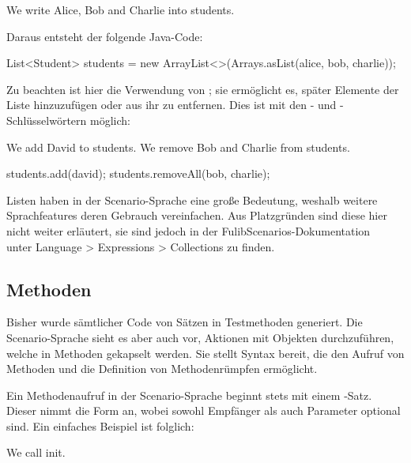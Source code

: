 \begin{codeblock}
    We write Alice, Bob and Charlie into students.
\end{codeblock}

Daraus entsteht der folgende Java-Code:

\begin{jcodeblock}
    List<Student> students = new ArrayList<>(Arrays.asList(alice, bob, charlie));
\end{jcodeblock}

Zu beachten ist hier die Verwendung von ;
sie ermöglicht es, später Elemente der Liste hinzuzufügen oder aus ihr zu entfernen.
Dies ist mit den - und -Schlüsselwörtern möglich:

\begin{codeblock}
    We add David to students.
    We remove Bob and Charlie from students.
\end{codeblock}

\begin{jcodeblock}
    students.add(david);
    students.removeAll(bob, charlie);
\end{jcodeblock}

Listen haben in der Scenario-Sprache eine große Bedeutung, weshalb weitere Sprachfeatures deren Gebrauch vereinfachen.
Aus Platzgründen sind diese hier nicht weiter erläutert,
sie sind jedoch in der FulibScenarios-Dokumentation~\cite{documentation} unter Language > Expressions > Collections zu finden.

\subsection{Methoden}\label{subsec:methods}

Bisher wurde sämtlicher Code von Sätzen in Testmethoden generiert.
Die Scenario-Sprache sieht es aber auch vor, Aktionen mit Objekten durchzuführen, welche in Methoden gekapselt werden.
Sie stellt Syntax bereit, die den Aufruf von Methoden und die Definition von Methodenrümpfen ermöglicht.

Ein Methodenaufruf in der Scenario-Sprache beginnt stets mit einem -Satz.
Dieser nimmt die Form  an, wobei sowohl Empfänger als auch Parameter optional sind.
Ein einfaches Beispiel ist folglich:

\begin{codeblock}
    We call init.
\end{codeblock}

